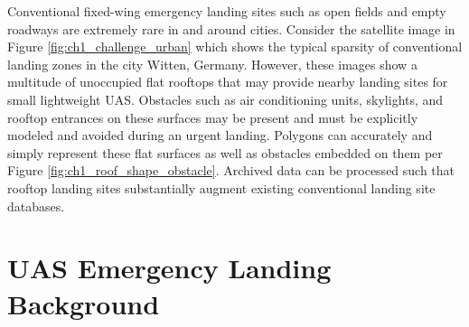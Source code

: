 Conventional fixed-wing emergency landing sites such as open fields and empty roadways are extremely rare in and around cities. Consider the satellite image in Figure \ref{fig:ch1_challenge_urban} which shows the typical sparsity of conventional landing zones in the city Witten, Germany. However, these images show a multitude of unoccupied flat rooftops that may provide nearby landing sites for small lightweight UAS. Obstacles such as air conditioning units, skylights, and rooftop entrances on these surfaces may be present and must be explicitly modeled and avoided during an urgent landing. Polygons can accurately and simply represent these flat surfaces as well as obstacles embedded on them per Figure \ref{fig:ch1_roof_shape_obstacle}. Archived data can be processed such that rooftop landing sites substantially augment existing conventional landing site databases.




\section{UAS Emergency Landing Background}



